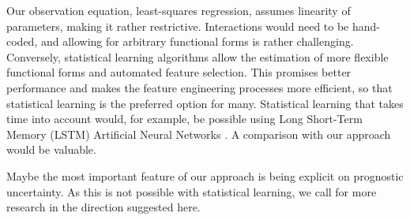 \documentclass{article}
\begin{document}
Our observation equation, least-squares regression, assumes linearity of parameters, making it rather restrictive. Interactions would need to be hand-coded, and allowing for arbitrary functional forms is rather challenging. Conversely, statistical learning algorithms allow the estimation of more flexible functional forms and automated feature selection. This promises better performance and makes the feature engineering processes more efficient, so that statistical learning is the preferred option for many. Statistical learning that takes time into account would, for example, be possible using Long Short-Term Memory (LSTM) Artificial Neural Networks \citep{hochreiter_long_1997}. A comparison with our approach would be valuable.

Maybe the most important feature of our approach is being explicit on prognostic uncertainty. As this is not possible with statistical learning, we call for more research in the direction suggested here.









\end{document}

